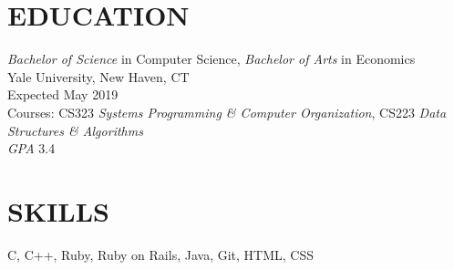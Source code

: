 \documentclass[margin, centered]{res}
\begin{document}
\address{\href{mailto:melina.delgado@yale.edu}{melina.delgado@yale.edu} | \href{http://github.com/melina-delgado}{github.com/melina-delgado} | \href{http://linkedin.com/in/melina-delgado}{linkedin.com/in/melina-delgado} \\ 130 Prospect St, New Haven, CT 06511 \\ (954) 682 -8999}

\begin{resume}
  \section{EDUCATION}
  \textit{Bachelor of Science} in Computer Science, \textit{Bachelor of Arts} in Economics \\
  Yale University, New Haven, CT \\
  Expected May 2019 \\
  Courses: CS323 \textit{Systems Programming \& Computer Organization}, CS223 \textit{Data Structures \& Algorithms} \\ 
  \textit{GPA} 3.4

  \section{SKILLS}
  C, C++, Ruby, Ruby on Rails, Java, Git, HTML, CSS
  


\end{resume}
\end{document}
